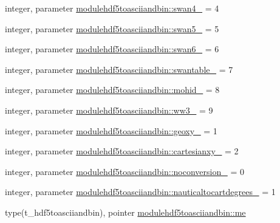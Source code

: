 \begin{DoxyCompactItemize}
integer, parameter \mbox{\hyperlink{namespacemodulehdf5toasciiandbin_a20d22b21a0e4df1d9460e82a3de204d9}{modulehdf5toasciiandbin\+::swan4\+\_\+}} = 4
\item 
integer, parameter \mbox{\hyperlink{namespacemodulehdf5toasciiandbin_a5a4a1a187cb7f1814d812807439ec637}{modulehdf5toasciiandbin\+::swan5\+\_\+}} = 5
\item 
integer, parameter \mbox{\hyperlink{namespacemodulehdf5toasciiandbin_a88daecd90699c02c2b159f06c3e1e735}{modulehdf5toasciiandbin\+::swan6\+\_\+}} = 6
\item 
integer, parameter \mbox{\hyperlink{namespacemodulehdf5toasciiandbin_a33258a20c893caf25d6afb6e4ad9f1ae}{modulehdf5toasciiandbin\+::swantable\+\_\+}} = 7
\item 
integer, parameter \mbox{\hyperlink{namespacemodulehdf5toasciiandbin_aca2c15fb6f00e7f949460c0795375d92}{modulehdf5toasciiandbin\+::mohid\+\_\+}} = 8
\item 
integer, parameter \mbox{\hyperlink{namespacemodulehdf5toasciiandbin_a5e88f7de32dfd93917658a3d32c5f688}{modulehdf5toasciiandbin\+::ww3\+\_\+}} = 9
\item 
integer, parameter \mbox{\hyperlink{namespacemodulehdf5toasciiandbin_a0a361be298a23d0cc502f93ca054fb97}{modulehdf5toasciiandbin\+::geoxy\+\_\+}} = 1
\item 
integer, parameter \mbox{\hyperlink{namespacemodulehdf5toasciiandbin_af67d5747ca401341575f80bd92bffd79}{modulehdf5toasciiandbin\+::cartesianxy\+\_\+}} = 2
\item 
integer, parameter \mbox{\hyperlink{namespacemodulehdf5toasciiandbin_af945d9f20a4ecb4c71cc4cfcfd8af32a}{modulehdf5toasciiandbin\+::noconversion\+\_\+}} = 0
\item 
integer, parameter \mbox{\hyperlink{namespacemodulehdf5toasciiandbin_a5aef654a4ed563f0888f41590ac85282}{modulehdf5toasciiandbin\+::nauticaltocartdegrees\+\_\+}} = 1
\item 
type(t\+\_\+hdf5toasciiandbin), pointer \mbox{\hyperlink{namespacemodulehdf5toasciiandbin_abb9464da6cd9a0a147fcb62f615a6bdd}{modulehdf5toasciiandbin\+::me}}
\end{DoxyCompactItemize}
